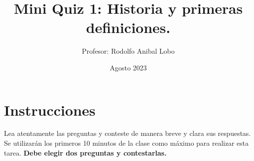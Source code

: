 \documentclass{exam}
\title{Mini Quiz 1: Historia y primeras definiciones.}
\author{Profesor: Rodolfo Anibal Lobo}
\date{Agosto 2023}
\theoremstyle{definition}
\begin{document}
\maketitle



\section*{Instrucciones}
\thispagestyle{empty}
Lea atentamente las preguntas y conteste de manera breve y clara sus respuestas. Se utilizarán los primeros 10 minutos de la clase como máximo para realizar esta tarea. \textbf{Debe elegir dos preguntas y contestarlas.}
\end{document}
